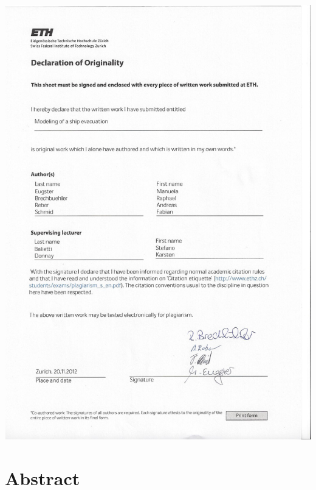 \documentclass[11pt]{article}
\begin{document}
\includegraphics[width=\textwidth]{declaration.jpg}




\tableofcontents

\newpage




\section{Abstract}
\end{document}
